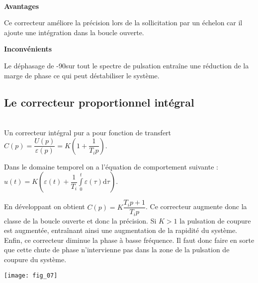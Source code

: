 \begin{resultat} ~\\
\vspace{-1.5cm}
\begin{multicols}{2}
\begin{center}
\textbf{Avantages}
\end{center}
Ce correcteur améliore la précision lors de la sollicitation par un échelon car il ajoute une intégration dans la boucle ouverte. 
\begin{center}
\textbf{Inconvénients}
\end{center}
Le déphasage de -90\degres sur tout le spectre de pulsation entraîne une réduction de la marge de phase ce qui peut déstabiliser le système. 
\end{multicols}
\end{resultat}

\subsection{Le correcteur proportionnel intégral}

\noindent\begin{minipage}[c]{.49\linewidth}
\begin{defi} ~\\

Un correcteur intégral pur a pour fonction de transfert $C(p)=\dfrac{U(p)}{\varepsilon(p)}=K\left( 1+\dfrac{1}{T_i p}\right)$.

Dans le domaine temporel on a l'équation de comportement suivante : $u(t)=K\left(\varepsilon(t)+\dfrac{1}{T_i}\int\limits_0^t \varepsilon (\tau)\text{d}\tau\right)$.
\end{defi}

En développant on obtient $C(p)=K\dfrac{T_i p+1}{T_i p}$. Ce correcteur augmente donc la classe de la boucle ouverte et donc la précision. Si $K>1$ la pulsation de coupure est augmentée, entraînant ainsi une augmentation de la rapidité du système. Enfin, ce correcteur diminue la phase à basse fréquence. Il faut donc faire en sorte que cette chute de phase n'intervienne pas dans la zone de la pulsation de coupure du système.
\end{minipage} \hfill
\begin{minipage}[c]{.49\linewidth}
\begin{center}
\texttt{[image: fig\_07]}
\end{center}
\end{minipage}


